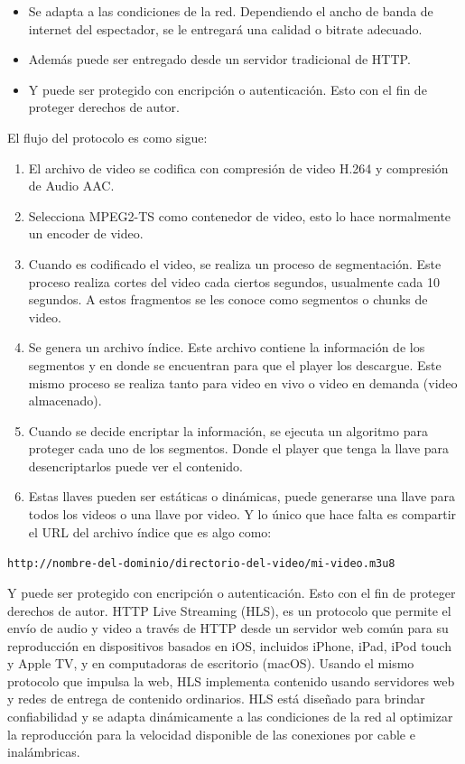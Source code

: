\begin{itemize}
    \item Se adapta a las condiciones de la red. Dependiendo el ancho de banda de internet del espectador, se le entregará una calidad o bitrate adecuado.
    \item Además puede ser entregado desde un servidor tradicional de HTTP.
    \item Y puede ser protegido con encripción o autenticación.  Esto con el fin de proteger derechos de autor.
\end{itemize}

El flujo del protocolo es como sigue: 
\begin{enumerate}
    \item El archivo de video se codifica con compresión de video H.264 y compresión de Audio AAC.
    \item Selecciona MPEG2-TS como contenedor de video, esto lo hace normalmente un encoder de video.
    \item Cuando es codificado el video, se realiza un proceso de segmentación.  Este proceso realiza cortes del video cada ciertos segundos, usualmente cada 10 segundos. A estos fragmentos se les conoce como segmentos o chunks de video.
    \item Se genera un archivo índice. Este archivo contiene la información de los segmentos y en donde se encuentran para que el player los descargue. Este mismo proceso se realiza tanto para video en vivo o video en demanda (video almacenado).
    \item Cuando se decide encriptar la información, se ejecuta un algoritmo para proteger cada uno de los segmentos. Donde el player que tenga la llave para desencriptarlos puede ver el contenido.
    \item  Estas llaves pueden ser estáticas o dinámicas, puede generarse una llave para todos los videos o una llave por video. Y lo único que hace falta es compartir el URL del archivo índice que es algo como:
\end{enumerate}
            
\begin{center}
    \verb|http://nombre-del-dominio/directorio-del-video/mi-video.m3u8|    
\end{center}

Y puede ser protegido con encripción o autenticación.  Esto con el fin de proteger derechos de autor.
HTTP Live Streaming (HLS), es un protocolo que permite el envío de audio y video a través de HTTP desde un servidor web común para su reproducción en dispositivos basados en iOS, incluidos iPhone, iPad, iPod touch y Apple TV, y en computadoras de escritorio (macOS). Usando el mismo protocolo que impulsa la web, HLS implementa contenido usando servidores web y redes de entrega de contenido ordinarios. HLS está diseñado para brindar confiabilidad y se adapta dinámicamente a las condiciones de la red al optimizar la reproducción para la velocidad disponible de las conexiones por cable e inalámbricas.\\

